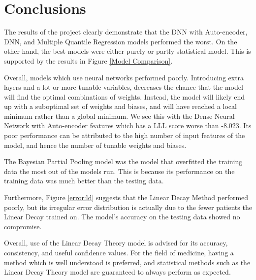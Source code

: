 \documentclass[12pt]{article}
\begin{document}
\section{Conclusions}


The results of the project clearly demonstrate that the DNN with Auto-encoder, DNN, and Multiple Quantile Regression models performed the worst.
On the other hand, the best models were either purely or partly statistical model.
This is supported by the results in Figure \ref{Model Comparison}. 

Overall, models which use neural networks performed poorly.
Introducing extra layers and a lot or more tunable variables, decreases the chance that the model will find the optimal combinations of weights.
Instead, the model will likely end up with a suboptimal set of weights and biases, and will have reached a local minimum rather than a global minimum.
We see this with the Dense Neural Network with Auto-encoder features which has a LLL score worse than -8.023.
Its poor performance can be attributed to the high number of input features of the model, and hence the number of tunable weights and biases.

The Bayesian Partial Pooling model was the model that overfitted the training data the most out of the models run.
This is because its performance on the training data was much better than the testing data.

Furthermore, Figure \ref{error:ld} suggests that the Linear Decay Method performed poorly, but its irregular error distribution is actually due to the fewer patients the Linear Decay trained on.
The model's accuracy on the testing data showed no compromise.

Overall, use of the Linear Decay Theory model is advised for its accuracy, consistency, and useful confidence values.
For the field of medicine, having a method which is well understood is preferred, and statistical methods such as the Linear Decay Theory model are guaranteed to always perform as expected.
\end{document}
